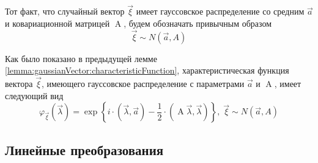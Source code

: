 \begin{definition}
  Тот факт, что случайный вектор $\vec{\xi}$ имеет гауссовское распределение
  со средним $\vec{a}$ и ковариационной матрицей
  $\operatorname{A}$, будем обозначать привычным образом
  $$\vec{\xi} \sim N\left( \vec{a}, A \right)$$
\end{definition}

\begin{remark}
  \label{remark:gaussianVector:characteristicFunction}
  Как было показано в предыдущей лемме
  \ref{lemma:gaussianVector:characteristicFunction}, характеристическая
  функция вектора $\vec{\xi}$, имеющего гауссовское распределение с
  параметрами $\vec{a}$ и $\operatorname{A}$, имеет следующий вид
  $$\varphi_{\vec{\xi}}\left( \vec{\lambda} \right)
      = \exp{\left\{ i \cdot \left( \vec{\lambda}, \vec{a} \right)
      - \frac{1}{2} \cdot \left( \operatorname{A} \vec{\lambda} ,
          \vec{\lambda} \right) \right\}},\;
      \vec{\xi} \sim N\left( \vec{a}, A \right)$$
\end{remark}

\subsection{Линейные преобразования}

